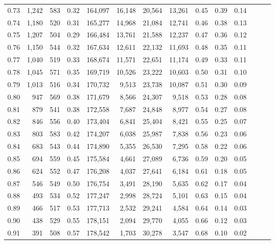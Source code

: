 \begin{tabular}{rrrrrrrrrrrrrr}
0.73 &  1,242 &  583 &  0.32 &  164,097 &   16,148 &  20,564 &  13,261 &  0.45 &  0.39 &      0.14 \\
0.74 &  1,180 &  520 &  0.31 &  165,277 &   14,968 &  21,084 &  12,741 &  0.46 &  0.38 &      0.13 \\
0.75 &  1,207 &  504 &  0.29 &  166,484 &   13,761 &  21,588 &  12,237 &  0.47 &  0.36 &      0.12 \\
0.76 &  1,150 &  544 &  0.32 &  167,634 &   12,611 &  22,132 &  11,693 &  0.48 &  0.35 &      0.11 \\
0.77 &  1,040 &  519 &  0.33 &  168,674 &   11,571 &  22,651 &  11,174 &  0.49 &  0.33 &      0.11 \\
0.78 &  1,045 &  571 &  0.35 &  169,719 &   10,526 &  23,222 &  10,603 &  0.50 &  0.31 &      0.10 \\
0.79 &  1,013 &  516 &  0.34 &  170,732 &    9,513 &  23,738 &  10,087 &  0.51 &  0.30 &      0.09 \\
0.80 &    947 &  569 &  0.38 &  171,679 &    8,566 &  24,307 &   9,518 &  0.53 &  0.28 &      0.08 \\
0.81 &    879 &  541 &  0.38 &  172,558 &    7,687 &  24,848 &   8,977 &  0.54 &  0.27 &      0.08 \\
0.82 &    846 &  556 &  0.40 &  173,404 &    6,841 &  25,404 &   8,421 &  0.55 &  0.25 &      0.07 \\
0.83 &    803 &  583 &  0.42 &  174,207 &    6,038 &  25,987 &   7,838 &  0.56 &  0.23 &      0.06 \\
0.84 &    683 &  543 &  0.44 &  174,890 &    5,355 &  26,530 &   7,295 &  0.58 &  0.22 &      0.06 \\
0.85 &    694 &  559 &  0.45 &  175,584 &    4,661 &  27,089 &   6,736 &  0.59 &  0.20 &      0.05 \\
0.86 &    624 &  552 &  0.47 &  176,208 &    4,037 &  27,641 &   6,184 &  0.61 &  0.18 &      0.05 \\
0.87 &    546 &  549 &  0.50 &  176,754 &    3,491 &  28,190 &   5,635 &  0.62 &  0.17 &      0.04 \\
0.88 &    493 &  534 &  0.52 &  177,247 &    2,998 &  28,724 &   5,101 &  0.63 &  0.15 &      0.04 \\
0.89 &    466 &  517 &  0.53 &  177,713 &    2,532 &  29,241 &   4,584 &  0.64 &  0.14 &      0.03 \\
0.90 &    438 &  529 &  0.55 &  178,151 &    2,094 &  29,770 &   4,055 &  0.66 &  0.12 &      0.03 \\
0.91 &    391 &  508 &  0.57 &  178,542 &    1,703 &  30,278 &   3,547 &  0.68 &  0.10 &      0.02 \\

\end{tabular}
